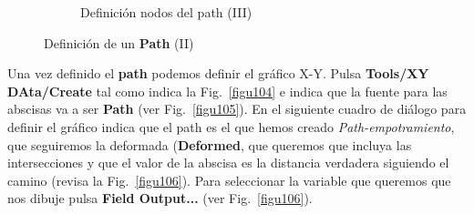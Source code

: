 \begin{enumerate}
\begin{figure}[H]
\begin{subfigure}{0.39\textwidth}
     \caption{Definición nodos del path (III)}
     \label{figu103}
   \end{subfigure}%
   \caption{Definición de un \textbf{Path} (II)}
 \end{figure}

 Una vez definido el \textbf{path} podemos definir el gráfico
 X-Y. Pulsa \textbf{Tools/XY DAta/Create} tal como indica la
 Fig.~\ref{figu104} e indica que la fuente para las abscisas va a ser
 \textbf{Path} (ver Fig.~\ref{figu105}). En el siguiente cuadro de
 diálogo para definir el gráfico indica que el path es el que hemos
 creado \textit{Path-empotramiento}, que seguiremos la deformada
 (\textbf{Deformed}, que queremos que incluya las intersecciones y que
 el valor de la abscisa es la distancia verdadera siguiendo el camino
 (revisa la Fig.~\ref{figu106}). Para seleccionar la variable que
 queremos que nos dibuje pulsa \textbf{Field Output...} (ver
 Fig.~\ref{figu106}).


\end{enumerate}
